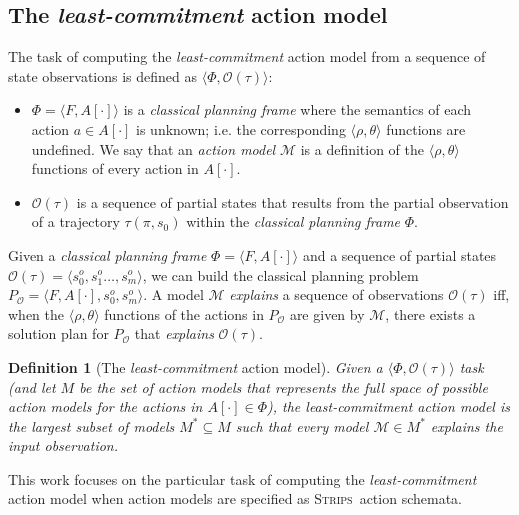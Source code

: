 \documentclass{article}
\newcommand{\tup}[1]{{\langle #1 \rangle}}
\newcommand{\strips}{\textsc{Strips}}
\newtheorem{definition}[theorem]{Definition}
\begin{document}
\subsection{The {\em least-commitment} action model}
The task of computing the {\em least-commitment} action model from a sequence of state observations is defined as $\tup{\Phi,\mathcal{O}(\tau)}$:
\begin{itemize}
\item $\Phi=\tup{F,A[\cdot]}$ is a {\em classical planning frame} where the semantics of each action $a\in A[\cdot]$ is unknown; i.e. the corresponding $\tup{\rho,\theta}$ functions are undefined. We say that an {\em action model} $\mathcal{M}$ is a definition of the $\tup{\rho,\theta}$ functions of every action in $A[\cdot]$. 
\item $\mathcal{O}(\tau)$ is a sequence of partial states that results from the partial observation of a trajectory $\tau(\pi,s_0)$ within the {\em classical planning frame} $\Phi$.
\end{itemize}

Given a {\em classical planning frame} $\Phi=\tup{F,A[\cdot]}$ and a sequence of partial states $\mathcal{O}(\tau)=\tup{s_0^o,s_1^o \ldots , s_m^o}$, we can build the classical planning problem $P_\mathcal{O}=\tup{F,A[\cdot],s_0^o,s_m^o}$. A model $\mathcal{M}$ {\em explains} a sequence of observations $\mathcal{O}(\tau)$ iff, when the $\tup{\rho,\theta}$ functions of the actions in $P_\mathcal{O}$ are given by $\mathcal{M}$, there exists a solution plan for $P_\mathcal{O}$ that {\em explains} $\mathcal{O}(\tau)$. 
\begin{definition}[The {\em least-commitment} action model]
Given a $\tup{\Phi,\mathcal{O}(\tau)}$ task (and let $M$ be the set of action models that represents the full space of possible action models for the actions in $A[\cdot]\in \Phi$), the {\em least-commitment} action model is the largest subset of models $M^*\subseteq M$ such that every model $\mathcal{M}\in M^*$ {\em explains} the input observation.
\end{definition}

This work focuses on the particular task of computing the {\em least-commitment} action model when action models are specified as \strips\ action schemata. 
\end{document}
